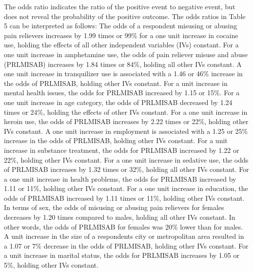 \documentclass[sigconf]{acmart}
\begin{document}
The odds ratio indicates the ratio of the positive event to negative event, 
but does not reveal the probability of the positive outcome. The odds ratios 
in Table 5 can be interpreted as follows: The odds of a respondent misusing or 
abusing pain relievers increases by 1.99 times or 99\% for a one unit increase 
in cocaine use, holding the effects of all other independent variables (IVs) 
constant. For a one unit increase in amphetamine use, the odds of pain reliever 
misuse and abuse (PRLMISAB) increases by 1.84 times or 84\%, holding all other 
IVs constant. A one unit increase in tranquilizer use is associated with a 
1.46 or 46\% increase in the odds of PRLMISAB, holding other IVs constant. 
For a unit increase in mental health issues, the odds for PRLMISAB increased 
by 1.15 or 15\%. For a one unit increase in age category, the odds of PRLMISAB 
decreased by 1.24 times or 24\%, holding the effects of other IVs constant. 
For a one unit increase in heroin use, the odds of PRLMISAB increases by 2.22 
times or 22\%, holding other IVs constant. A one unit increase in employment is 
associated with a 1.25 or 25\% increase in the odds of PRLMISAB, holding other 
IVs constant. For a unit increase in substance treatment, the odds for PRLMISAB 
increased by 1.22 or 22\%, holding other IVs constant. For a one unit increase 
in sedative use, the odds of PRLMISAB increases by 1.32 times or 32\%, holding 
all other IVs constant. For a one unit increase in health problems, the odds 
for PRLMISAB increased by 1.11 or 11\%, holding other IVs constant. For a one 
unit increase in education, the odds of PRLMISAB increased by 1.11 times or 
11\%, holding other IVs constant. In terms of sex, the odds of misusing or 
abusing pain relievers for females decreases by 1.20 times compared to males,
holding all other IVs constant. In other words, the odds of PRLMISAB for 
females was 20\% lower than for males. A unit increase in the size of a 
respondents city or metropolitan area resulted in a 1.07 or 7\% decrease in 
the odds of PRLMISAB, holding other IVs constant. For a unit increase in 
marital status, the odds for PRLMISAB increases by 1.05 or 5\%, 
holding other IVs constant. 
 
\end{document}
